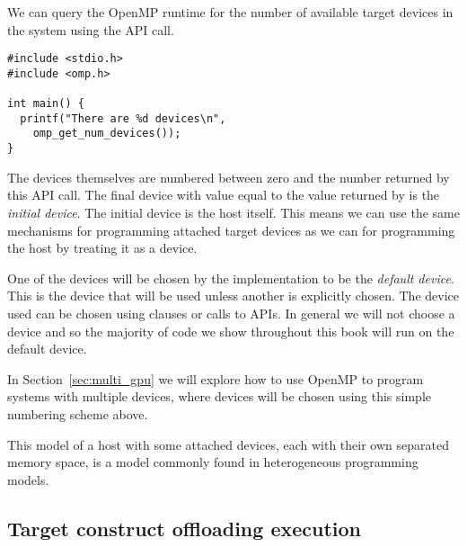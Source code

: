 We can query the OpenMP runtime for the number of available target devices in the system using the  API call.

\begin{verbatim}
#include <stdio.h>
#include <omp.h>

int main() {
  printf("There are %d devices\n",
    omp_get_num_devices());
}
\end{verbatim}

The devices themselves are numbered between zero and the number returned by this API call.
The final device with value equal to the value returned by  is the \emph{initial device}.
The initial device is the host itself.
This means we can use the same mechanisms for programming attached target devices as we can for programming the host by treating it as a device.

One of the devices will be chosen by the implementation to be the \emph{default device}.
This is the device that will be used unless another is explicitly chosen.
The device used can be chosen using clauses or calls to APIs.
In general we will not choose a device and so the majority of code we show throughout this book will run on the default device.

In Section~\ref{sec:multi_gpu} we will explore how to use OpenMP to program systems with multiple devices, where devices will be chosen using this simple numbering scheme above.

This model of a host with some attached devices, each with their own separated memory space, is a model commonly found in heterogeneous programming models.

\subsection{Target construct offloading execution}



